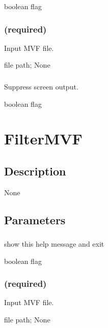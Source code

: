 \documentclass[letterpaper,11pt,english]{sphinxmanual}
\begin{document}
 boolean flag


\subsubsection{ (required)}
\label{\detokenize{prog_desc:id88}}
 Input MVF file.

 file path;  None


\subsubsection{}
\label{\detokenize{prog_desc:id89}}
 Suppress screen output.

 boolean flag


\section{FilterMVF}
\label{\detokenize{prog_desc:filtermvf}}

\subsection{Description}
\label{\detokenize{prog_desc:id90}}
None


\subsection{Parameters}
\label{\detokenize{prog_desc:id91}}

\subsubsection{}
\label{\detokenize{prog_desc:id92}}
 show this help message and exit

 boolean flag


\subsubsection{ (required)}
\label{\detokenize{prog_desc:id93}}
 Input MVF file.

 file path;  None
\end{document}
